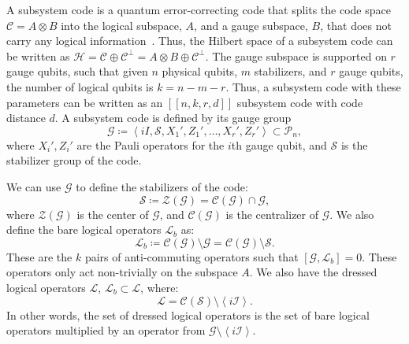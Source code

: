 \documentclass[conference]{IEEEtran}
\newcommand{\llbr}{[\![}
\newcommand{\rrbr}{]\!]}
\begin{document}
A subsystem code is a quantum error-correcting code that splits the code space $\mathcal{C}=A\otimes B$ into the logical subspace, $A$, and a gauge subspace, $B$, that does not carry any logical information~\cite{nbreuckmann}. Thus, the Hilbert space of a subsystem code can be written as $\mathcal{H}=\mathcal{C} \oplus \mathcal{C}^{\perp}=A \otimes B \oplus \mathcal{C}^{\perp}$. The gauge subspace is supported on $r$ gauge qubits, such that given $n$ physical qubits, $m$ stabilizers, and $r$ gauge qubits, the number of logical qubits is $k=n-m-r$.  Thus, a subsystem code with these parameters can be written as an $ \llbr n,k,r,d \rrbr$ subsystem code with code distance $d$. A subsystem code is defined by its gauge group 
\begin{equation}
    \mathcal{G} \coloneqq \left< iI,\mathcal{S},X_{1}',Z_{1}', \ldots, X_{r}',Z_{r}' \right> \subset \mathcal{P}_{n},
\end{equation} 
where $X_{i}', Z_{i}'$ are the  Pauli  operators for the $i$th gauge qubit, and $\mathcal{S}$ is the stabilizer group of the code. 

We can use $\mathcal{G}$ to define the stabilizers of the code: 
\begin{equation}
    \mathcal{S}\coloneqq\mathcal{Z}(\mathcal{G})=\mathcal{C}(\mathcal{G}) \cap \mathcal{G},
\end{equation} 
where $\mathcal{Z}(\mathcal{G})$ is the center of $\mathcal{G}$, and  $\mathcal{C}(\mathcal{G})$ is the centralizer of $\mathcal{G}$. We also define the bare logical operators $\mathcal{L}_{b}$ as: 
\begin{equation}
\mathcal{L}_{b}\coloneqq\mathcal{C}(\mathcal{G}) \setminus \mathcal{G} = \mathcal{C}(\mathcal{G}) \setminus \mathcal{S}.
\end{equation} 
These are the $k$ pairs of anti-commuting operators such that $[\mathcal{G},\mathcal{L}_b]=0$. These operators only act non-trivially on the subspace $A$. We also have the dressed logical operators $\mathcal{L}$, $\mathcal{L}_{b} \subset \mathcal{L}$, where: 
\begin{equation} 
\mathcal{L}=\mathcal{C}(\mathcal{S}) \setminus \left< i\mathcal{I} \right>. 
\end{equation} 
In other words, the set of dressed logical operators is the set of bare logical operators multiplied by an operator from $\mathcal{G} \setminus \left< i\mathcal{I} \right>$.
\end{document}
